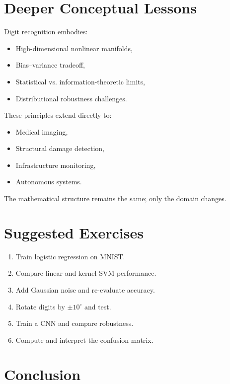 \documentclass[11pt]{article}
\begin{document}
\section{Deeper Conceptual Lessons}

Digit recognition embodies:

\begin{itemize}
    \item High-dimensional nonlinear manifolds,
    \item Bias--variance tradeoff,
    \item Statistical vs. information-theoretic limits,
    \item Distributional robustness challenges.
\end{itemize}

These principles extend directly to:

\begin{itemize}
    \item Medical imaging,
    \item Structural damage detection,
    \item Infrastructure monitoring,
    \item Autonomous systems.
\end{itemize}

The mathematical structure remains the same; only the domain changes.

\section{Suggested Exercises}

\begin{enumerate}
    \item Train logistic regression on MNIST.
    \item Compare linear and kernel SVM performance.
    \item Add Gaussian noise and re-evaluate accuracy.
    \item Rotate digits by $\pm 10^\circ$ and test.
    \item Train a CNN and compare robustness.
    \item Compute and interpret the confusion matrix.
\end{enumerate}

\section{Conclusion}
\end{document}
